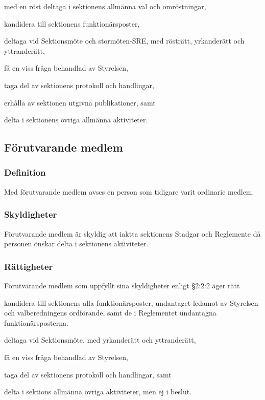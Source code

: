 \documentclass[10pt]{article}
\begin{document}
\begin{attlist}
\item med en röst deltaga i sektionens allmänna val och omröstningar,
\item kandidera till sektionens funktionärsposter,
\item deltaga vid Sektionsmöte och stormöten-SRE, med rösträtt, yrkanderätt
    och yttranderätt,
\item få en viss fråga behandlad av Styrelsen,
\item taga del av sektionens protokoll och handlingar,
\item erhålla av sektionen utgivna publikationer, samt
\item delta i sektionens övriga allmänna aktiviteter.
\end{attlist}


\subsection{Förutvarande medlem}
\subsubsection{Definition}
Med förutvarande medlem avses en person som tidigare varit ordinarie medlem.

\subsubsection{Skyldigheter}
Förutvarande medlem är skyldig att iaktta sektionens Stadgar och Reglemente
då personen önskar delta i sektionens aktiviteter.

\subsubsection{Rättigheter}
Förutvarande medlem som uppfyllt sina skyldigheter
enligt §2:2:2 äger rätt
\begin{attlist}
\item kandidera till sektionens alla funktionärsposter, undantaget ledamot av
    Styrelsen och valberedningens ordförande, samt de i
    Reglementet undantagna funktionärsposterna.
\item deltaga vid Sektionsmöte, med yrkanderätt och yttranderätt,
\item få en viss fråga behandlad av Styrelsen,
\item taga del av sektionens protokoll och handlingar, samt
\item delta i sektions allmänna övriga aktiviteter, men ej i beslut.
\end{attlist}
\end{document}
